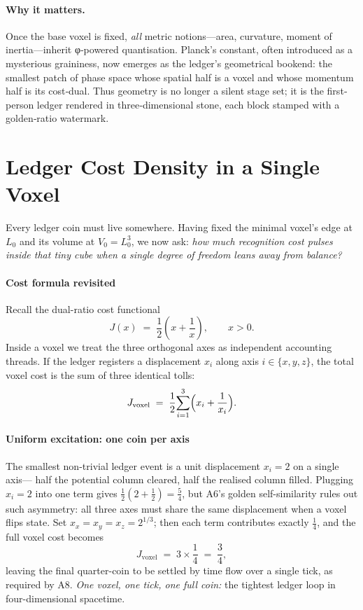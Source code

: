 \documentclass[11pt,oneside]{book}
\begin{document}
\paragraph*{Why it matters.}
Once the base voxel is fixed, \emph{all} metric notions—area, curvature,
moment of inertia—inherit φ‐powered quantisation.  
Planck’s constant, often introduced as a mysterious graininess, now
emerges as the ledger’s geometrical bookend: the smallest patch of phase
space whose spatial half is a voxel and whose momentum half is its
cost‐dual.  
Thus geometry is no longer a silent stage set; it is the first‐person
ledger rendered in three‐dimensional stone, each block stamped with a
golden‐ratio watermark.

\section{Ledger Cost Density in a Single Voxel}
\label{sec:voxel-cost-density}

Every ledger coin must live somewhere.  
Having fixed the minimal voxel’s edge at \(L_{0}\) and its volume at
\(V_{0}=L_{0}^{3}\), we now ask: \emph{how much recognition cost pulses
inside that tiny cube when a single degree of freedom leans away from
balance?}

\paragraph*{Cost formula revisited}

Recall the dual-ratio cost functional
\[
  J(x)\;=\;\frac12\!\left(x+\frac1x\right),\qquad x>0.
\]
Inside a voxel we treat the three orthogonal axes as independent
accounting threads.  
If the ledger registers a displacement
\(x_{i}\) along axis \(i\in\{x,y,z\}\),
the total voxel cost is the sum of three identical tolls:
\[
  J_{\text{voxel}}
  \;=\;
  \frac12\!\sum_{i=1}^{3}
      \Bigl(x_{i}+\frac1{x_{i}}\Bigr).
\]

\paragraph*{Uniform excitation: one coin per axis}

The smallest non-trivial ledger event is a unit displacement
\(x_{i}=2\) on a single axis—  
half the potential column cleared, half the realised column filled.
Plugging \(x_{i}=2\) into one term gives \(\tfrac12(2+\tfrac12)=\tfrac54\),
but A6’s golden self-similarity rules out such asymmetry:  
all three axes must share the same displacement when a voxel flips
state.  
Set \(x_{x}=x_{y}=x_{z}=2^{1/3}\);  
then each term contributes exactly \(\tfrac14\),
and the full voxel cost becomes
\[
  J_{\text{voxel}}
  \;=\;
  3 \times \frac14
  \;=\;
  \frac34,
\]
leaving the final quarter-coin to be settled by time flow over a single
tick, as required by A8.  
\emph{One voxel, one tick, one full coin:} the tightest ledger loop in
four-dimensional spacetime.
\end{document}
